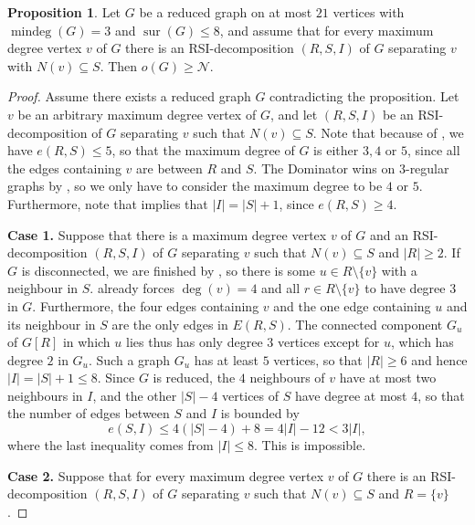 \documentclass[a4paper,11pt,oneside]{scrartcl}
\theoremstyle{definition}
\newtheorem{proposition}[definition]{Proposition}
\theoremstyle{remark}
\DeclareMathOperator{\mindeg}{mindeg}
\DeclareMathOperator{\sur}{sur}
\begin{document}
\begin{proposition}\label{proposition:mindeg_0_in_GR}
    Let $G$ be a reduced graph on at most $21$ vertices with $\mindeg(G) = 3$ and $\sur(G) \leq 8$, and assume that for every maximum degree vertex $v$ of $G$ there is an RSI-decomposition $(R,S,I)$ of $G$ separating $v$ with $N(v) \subseteq S$. Then $o(G) \geq \mathcal N$.
\end{proposition}
\begin{proof}
    Assume there exists a reduced graph $G$ contradicting the proposition. Let $v$ be an arbitrary maximum degree vertex of $G$, and let $(R,S,I)$ be an RSI-decomposition of $G$ separating $v$ such that $N(v) \subseteq S$. Note that because of , we have $e(R,S)\leq 5$, so that the maximum degree of $G$ is either $3,4$ or $5$, since all the edges containing $v$ are between $R$ and $S$. The Dominator wins on $3$-regular graphs by , so we only have to consider the maximum degree to be $4$ or $5$. Furthermore, note that  implies that $|I| = |S| + 1$, since $e(R,S) \geq 4$.

     \textbf{Case 1. } Suppose that there is a maximum degree vertex $v$ of $G$ and an RSI-decomposition $(R,S,I)$ of $G$ separating $v$ such that $N(v) \subseteq S$ and $|R| \geq 2$. If $G$ is disconnected, we are finished by , so there is some $u \in R\setminus \{v\}$ with a neighbour in $S$.  already forces $\deg(v) = 4$ and all $r \in R \setminus \{v\}$ to have degree $3$ in $G$. Furthermore, the four edges containing $v$ and the one edge containing $u$ and its neighbour in $S$ are the only edges in $E(R,S)$. The connected component $G_u$ of $G[R]$ in which $u$ lies thus has only degree $3$ vertices except for $u$, which has degree $2$ in $G_u$. Such a graph $G_u$ has at least $5$ vertices, so that $|R| \geq 6$ and hence $|I| = |S|+1 \leq 8$. Since $G$ is reduced, the $4$ neighbours of $v$ have at most two neighbours in $I$, and the other $|S| - 4$ vertices of $S$ have degree at most $4$, so that the number of edges between $S$ and $I$ is bounded by 
    \[
        e(S,I) \leq 4(|S|-4) + 8 = 4|I| - 12 < 3|I|,
    \]
    where the last inequality comes from $|I| \leq 8$. This is impossible.

    \textbf{Case 2. } Suppose that for every maximum degree vertex $v$ of $G$ there is an RSI-decomposition $(R,S,I)$ of $G$ separating $v$ such that $N(v) \subseteq S$ and $R = \{v\}$. 


\end{proof}
\end{document}
